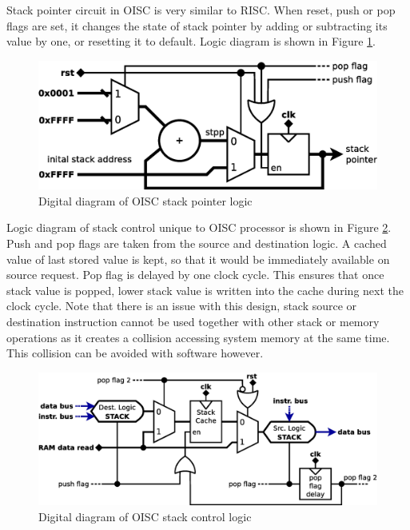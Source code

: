 Stack pointer circuit in OISC is very similar to RISC. When reset, push or pop flags are set, it changes the state of stack pointer by adding or subtracting its value by one, or resetting it to default. Logic diagram is shown in Figure \ref{fig:oisc_stack}.
\begin{figure}[b]
	\centering
	\includegraphics[scale=0.4]{../resources/oisc_stack.eps}
	\caption{Digital diagram of OISC stack pointer logic}
	\label{fig:oisc_stack}
\end{figure}

Logic diagram of stack control unique to OISC processor is shown in Figure \ref{fig:oisc_stack_2}. Push and pop flags are taken from the source and destination logic. A cached value of last stored value is kept, so that it would be immediately available on source request. Pop flag is delayed by one clock cycle. This ensures that once stack value is popped, lower stack value is written into the cache during next the clock cycle. Note that there is an issue with this design, stack source or destination instruction cannot be used together with other stack or memory operations as it creates a collision accessing system memory at the same time. This collision can be avoided with software however. 
\begin{figure}
	\centering
	\includegraphics[scale=0.4]{../resources/oisc_stack_2.eps}
	\caption{Digital diagram of OISC stack control logic}
	\label{fig:oisc_stack_2}
\end{figure}

